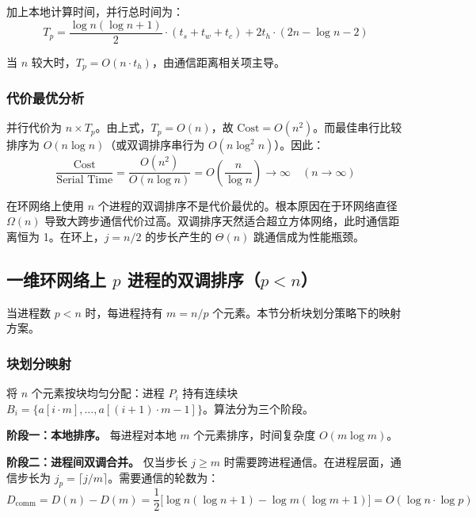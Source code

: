 \documentclass[UTF8,a4paper,10pt]{ctexart}
\begin{document}
加上本地计算时间，并行总时间为：
\begin{equation}
T_p = \frac{\log n(\log n + 1)}{2} \cdot (t_s + t_w + t_c) + 2t_h \cdot (2n - \log n - 2)
\end{equation}

当 $n$ 较大时，$T_p = O(n \cdot t_h)$，由通信距离相关项主导。

\subsubsection{代价最优分析}

并行代价为 $n \times T_p$。由上式，$T_p = O(n)$，故 $\text{Cost} = O(n^2)$。而最佳串行比较排序为 $O(n \log n)$（或双调排序串行为 $O(n \log^2 n)$）。因此：
\begin{equation}
\frac{\text{Cost}}{\text{Serial Time}} = \frac{O(n^2)}{O(n \log n)} = O\left(\frac{n}{\log n}\right) \to \infty \quad (n \to \infty)
\end{equation}

在环网络上使用 $n$ 个进程的双调排序不是代价最优的。根本原因在于环网络直径 $\Omega(n)$ 导致大跨步通信代价过高。双调排序天然适合超立方体网络，此时通信距离恒为 1。在环上，$j = n/2$ 的步长产生的 $\Theta(n)$ 跳通信成为性能瓶颈。

\subsection{一维环网络上 $p$ 进程的双调排序（$p < n$）}

当进程数 $p < n$ 时，每进程持有 $m = n/p$ 个元素。本节分析块划分策略下的映射方案。

\subsubsection{块划分映射}

将 $n$ 个元素按块均匀分配：进程 $P_i$ 持有连续块 $B_i = \{a[i \cdot m], \ldots, a[(i+1) \cdot m - 1]\}$。算法分为三个阶段。

\textbf{阶段一：本地排序。} 每进程对本地 $m$ 个元素排序，时间复杂度 $O(m \log m)$。

\textbf{阶段二：进程间双调合并。} 仅当步长 $j \geq m$ 时需要跨进程通信。在进程层面，通信步长为 $j_p = \lceil j/m \rceil$。需要通信的轮数为：
\begin{equation}
D_{\text{comm}} = D(n) - D(m) = \frac{1}{2}\bigl[\log n(\log n + 1) - \log m(\log m + 1)\bigr] = O(\log n \cdot \log p)
\end{equation}
\end{document}
